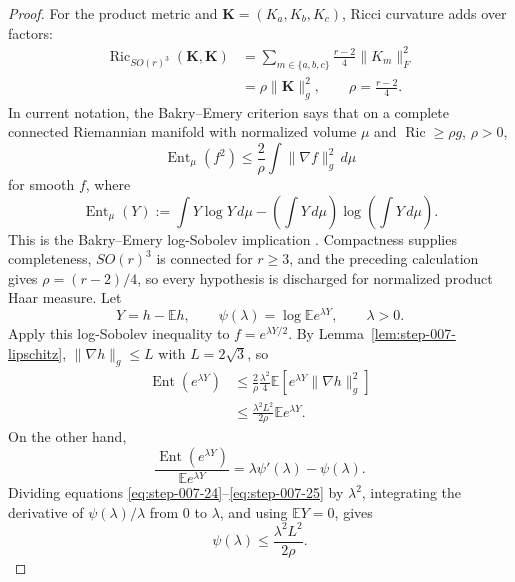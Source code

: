 \begin{proof}
For the product metric and
\(\mathbf K=(K_a,K_b,K_c)\), Ricci curvature adds over factors:
\begin{equation}
\begin{aligned}
  \operatorname{Ric}_{SO(r)^3}(\mathbf K,\mathbf K)
  &=\sum_{m\in\{a,b,c\}}
    \frac{r-2}{4}\|K_m\|_F^2\\
  &=\rho\|\mathbf K\|_g^2,
  \qquad \rho=\frac{r-2}{4}.
\end{aligned}\label{eq:step-007-23}
\end{equation}
In current notation, the Bakry--Emery criterion says that on a
complete connected Riemannian manifold with normalized volume \(\mu\) and
\(\operatorname{Ric}\ge\rho g\), \(\rho>0\),
\[
  \operatorname{Ent}_\mu(f^2)
  \le \frac2\rho\int\|\nabla f\|_g^2\,d\mu
\]
for smooth \(f\), where
\[
  \operatorname{Ent}_\mu(Y)
  :=\int Y\log Y\,d\mu
    -\left(\int Y\,d\mu\right)
       \log\left(\int Y\,d\mu\right).
\]
This is the Bakry--Emery log-Sobolev implication
\citep[Chapter~5]{bakryGentilLedoux2014}.  Compactness supplies completeness,
\(SO(r)^3\) is connected for \(r\ge3\), and the preceding calculation gives
\(\rho=(r-2)/4\), so every hypothesis is discharged for normalized product
Haar measure. Let
\[
  Y=h-\mathbb Eh,
  \qquad
  \psi(\lambda)=\log\mathbb E e^{\lambda Y},
  \qquad \lambda>0.
\]
Apply this log-Sobolev inequality to \(f=e^{\lambda Y/2}\). By
Lemma~\ref{lem:step-007-lipschitz}, \(\|\nabla h\|_g\le L\) with
\(L=2\sqrt3\), so
\begin{equation}
\begin{aligned}
  \operatorname{Ent}(e^{\lambda Y})
  &\le \frac2\rho\frac{\lambda^2}{4}
    \mathbb E[e^{\lambda Y}\|\nabla h\|_g^2]\\
  &\le \frac{\lambda^2L^2}{2\rho}\mathbb E e^{\lambda Y}.
\end{aligned}\label{eq:step-007-24}
\end{equation}
On the other hand,
\begin{equation}
  \frac{\operatorname{Ent}(e^{\lambda Y})}
       {\mathbb E e^{\lambda Y}}
  =\lambda\psi'(\lambda)-\psi(\lambda).                   \label{eq:step-007-25}
\end{equation}
Dividing equations \eqref{eq:step-007-24}--\eqref{eq:step-007-25} by \(\lambda^2\), integrating the derivative
of \(\psi(\lambda)/\lambda\) from \(0\) to \(\lambda\), and using
\(\mathbb EY=0\), gives
\begin{equation}
  \psi(\lambda)\le\frac{\lambda^2L^2}{2\rho}.             \label{eq:step-007-26}
\end{equation}

\end{proof}
